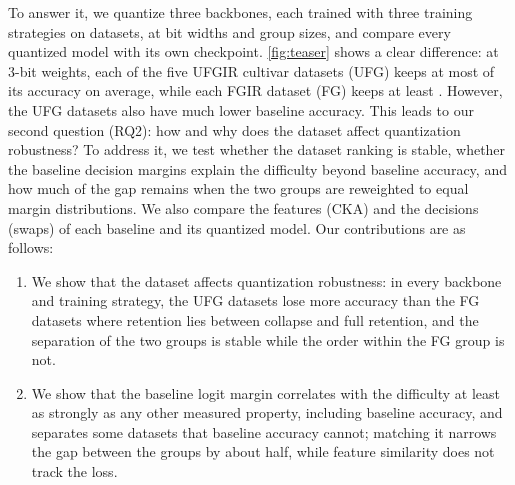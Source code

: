 To answer it, we quantize three backbones, each trained with three training strategies on  datasets, at  bit widths and  group sizes, and compare every quantized model with its own checkpoint.
\cref{fig:teaser} shows a clear difference: at 3-bit weights, each of the five UFGIR cultivar datasets (UFG) keeps at most  of its accuracy on average, while each FGIR dataset (FG) keeps at least .
However, the UFG datasets also have much lower baseline accuracy.
This leads to our second question (RQ2): how and why does the dataset affect quantization robustness?
To address it, we test whether the dataset ranking is stable, whether the baseline decision margins explain the difficulty beyond baseline accuracy, and how much of the gap remains when the two groups are reweighted to equal margin distributions.
We also compare the features (CKA) and the decisions (swaps) of each baseline and its quantized model.
Our contributions are as follows:
\begin{enumerate}
  \item We show that the dataset affects quantization robustness: in every backbone and training strategy, the UFG datasets lose more accuracy than the FG datasets where retention lies between collapse and full retention, and the separation of the two groups is stable while the order within the FG group is not.
  \item We show that the baseline logit margin correlates with the difficulty at least as strongly as any other measured property, including baseline accuracy, and separates some datasets that baseline accuracy cannot; matching it narrows the gap between the groups by about half, while feature similarity does not track the loss.
\end{enumerate}
